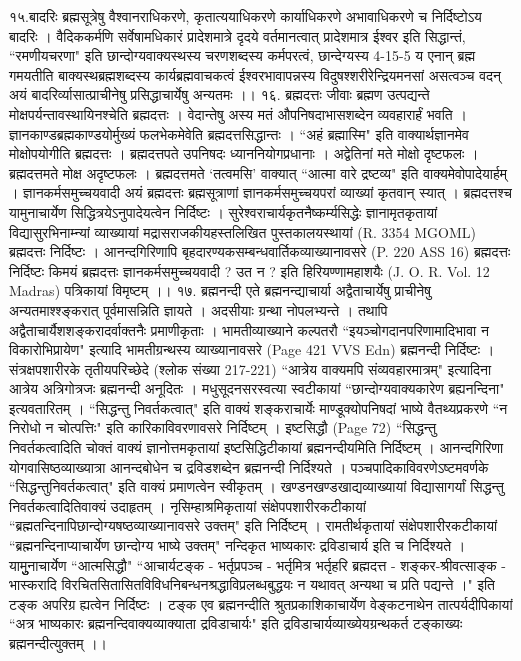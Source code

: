 १५.बादरिः
ब्रह्मसूत्रेषु वैश्वानराधिकरणे, कृतात्ययाधिकरणे कार्याधिकरणे अभावाधिकरणे च निर्दिष्टोऽय बादरिः । वैदिककर्मणि सर्वेषामधिकारं प्रादेशमात्रे दृदये वर्तमानत्वात् प्रादेशमात्र ईश्वर इति सिद्धान्तं, ``रमणीयचरणा" इति छान्दोग्यवाक्यस्थस्य चरणशब्दस्य कर्मपरत्वं, छान्देग्यस्य 4-15-5 य एनान् ब्रह्म गमयतीति बाक्यस्थब्रह्मशब्दस्य कार्यब्रह्मवाचकत्वं ईश्वरभावापन्नस्य विदुषश्शरीरेन्द्रियमनसां असत्वञ्च वदन् अयं बादरिर्व्यासात्प्राचीनेषु प्रसिद्धाचार्येषु अन्यतमः ।।
१६. ब्रह्मदत्तः
जीवाः ब्रह्मण उत्पद्यन्ते मोक्षपर्यन्तावस्थायिनश्चेति ब्रह्मदत्तः । वेदान्तेषु अस्य मतं औपनिषदाभासशब्देन व्यवहारार्हं भवति । ज्ञानकाण्डब्रह्मकाण्डयोर्मुख्यं फलभेकमेवेति ब्रह्मदत्तसिद्धान्तः । ``अहं ब्रह्मास्मि" इति वाक्यार्थज्ञानमेव मोक्षोपयोगीति ब्रह्मदत्तः । ब्रह्मदत्तपते उपनिषदः ध्याननियोगप्रधानाः । अद्वेतिनां मते मोक्षो दृष्टफलः । ब्रह्मदत्तमते मोक्ष अदृष्टफलः । ब्रह्मदत्तमते `तत्वमसि' वाक्यात् ``आत्मा वारे द्रष्टव्य" इति वाक्यमेवोपादेयार्हम् ।
ज्ञानकर्मसमुच्चयवादी अयं ब्रह्मदत्तः ब्रह्मसूत्राणां ज्ञानकर्मसमुच्चयपरां व्याख्यां कृतवान् स्यात् । ब्रह्मदत्तश्च यामुनाचार्येण सिद्धित्रयेऽनुपादेयत्वेन निर्दिष्टः । सुरेश्वराचार्यकृतनैष्कर्म्यसिद्धेः ज्ञानामृतकृतायां विद्यासुरभिनाम्न्यां व्याख्यायां मद्रासराजकीयहस्तलिखित पुस्तकालयस्थायां (R. 3354 MGOML) ब्रह्मदत्तः निर्दिष्टः । आनन्दगिरिणापि बृहदारण्यकसम्बन्धवार्तिकव्याख्यानावसरे (P. 220 ASS 16) ब्रह्मदत्तः निर्दिष्टः 
किमयं ब्रह्मदत्तः ज्ञानकर्मसमुच्चयवादी ? उत न ? इति हिरियण्णामहाशयैः (J. O. R. Vol. 12 Madras) पत्रिकायां विमृष्टम् ।।
१७. ब्रह्मनन्दी
एते ब्रह्मनन्द्याचार्या अद्वैताचार्येषु प्राचीनेषु अन्यतमाश्श्ङ्करात् पूर्वमासन्निति ज्ञायते । अदसीयाः ग्रन्था नोपलभ्यन्ते । तथापि अद्वैताचार्यैशशङ्करादर्वाक्तनैः प्रमाणीकृताः । 
भामतीव्याख्याने कल्पतरौ ``इयञ्चोगदानपरिणामादिभावा न विकारोभिप्रायेण" इत्यादि भामतीग्रन्थस्य व्याख्यानावसरे (Page 421 VVS Edn) ब्रह्मनन्दी निर्दिष्टः । संत्रक्षपशारीरके तृतीयपरिच्छेदे (श्लोक संख्या 217-221) ``आत्रेय वाक्यमपि संव्यवहारमात्रम्" इत्यादिना आत्रेय अत्रिगोत्रजः ब्रह्मनन्दी अनूदितः । मधुसूदनसरस्वत्या स्वटीकायां ``छान्दोग्यवाक्यकारेण ब्रह्यनन्दिना" इत्यवतारितम् । ``सिद्धन्तु निवर्तकत्वात्" इति वाक्यं शङ्कराचार्येः माण्डूक्योपनिषदां भाष्ये वैतथ्यप्रकरणे ``न निरोधो न चोत्पत्तिः" इति कारिकाविवरणावसरे निर्दिष्टम् । इष्टसिद्धौ (Page 72) ``सिद्धन्तु निवर्तकत्वादिति चोक्तं वाक्यं ज्ञानोत्तमकृतायां इष्टसिद्धिटीकायां ब्रह्मनन्दीयमिति निर्दिष्टम् । आनन्दगिरिणा योगवासिष्ठव्याख्यात्रा आनन्दबोधेन च द्रविडशब्देन ब्रह्मनन्दी निर्दिश्यते । पञ्चपादिकाविवरणेऽष्टमवर्णके ``सिद्धन्तुनिवर्तकत्वात्" इति वाक्यं प्रमाणत्वेन स्वीकृतम् । खण्डनखण्डखाद्यव्याख्यायां विद्यासागर्यां सिद्धन्तु निवर्तकत्वादितिवाक्यं उदाहृतम् । नृसिम्हाश्रमिकृतायां संक्षेपपशारीरकटीकायां ``ब्रह्मतन्दिनापिछान्दोग्यषष्ठव्याख्यानावसरे उक्तम्" इति निर्दिष्टम् । रामतीर्थकृतायां संक्षेपशारीरकटीकायां ``ब्रह्मनन्दिनाप्याचार्येण छान्दोग्य भाष्ये उक्तम्" नन्दिकृत भाष्यकारः द्रविडाचार्य इति च निर्दिश्यते । यामुुुनाचार्येण ``आत्मसिद्धौ" ``आचार्यटङ्क - भर्तृप्रपञ्च - भर्तृमित्र भर्तृहरि ब्रह्मदत्त - शङ्कर-श्रीवत्साङ्क - भास्करादि विरचितसितासितविविधनिबन्धनश्रद्धाविप्रलब्धबुद्धयः न यथावत् अन्यथा च प्रति पद्यन्ते ।" इति टङ्क अपरिग्र ह्यत्वेन निर्दिष्टः । टङ्क एव ब्रह्मनन्दीति श्रुतप्रकाशिकाचार्येण वेङ्कटनाथेन तात्पर्यदीपिकायां ``अत्र भाष्यकारः ब्रह्मनन्दिवाक्यव्याक्याता द्रविडाचार्यः" इति द्रविडाचार्यव्याख्येयग्रन्थकर्त टङ्काख्यः ब्रह्मनन्दीत्युक्तम् ।।
